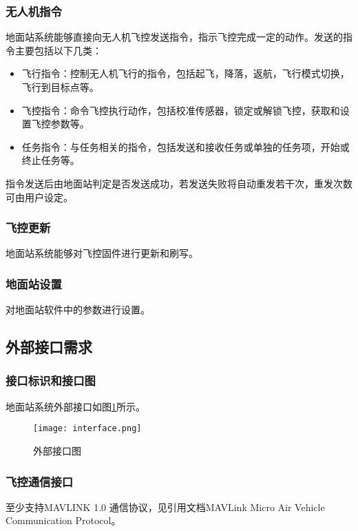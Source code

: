 \subsubsection{无人机指令}
地面站系统能够直接向无人机飞控发送指令，指示飞控完成一定的动作。发送的指令主要包括以下几类：
\begin{itemize}
\setlength{\itemsep}{-2pt}
\item 飞行指令：控制无人机飞行的指令，包括起飞，降落，返航，飞行模式切换，飞行到目标点等。
\item 飞控指令：命令飞控执行动作，包括校准传感器，锁定或解锁飞控，获取和设置飞控参数等。
\item 任务指令：与任务相关的指令，包括发送和接收任务或单独的任务项，开始或终止任务等。
\end{itemize}

指令发送后由地面站判定是否发送成功，若发送失败将自动重发若干次，重发次数可由用户设定。

\subsubsection{飞控更新}
地面站系统能够对飞控固件进行更新和刷写。

\subsubsection{地面站设置}
对地面站软件中的参数进行设置。

\subsection{外部接口需求}

\subsubsection{接口标识和接口图}
地面站系统外部接口如图\ref{f3int}所示。
\begin{figure}[ht]
	\begin{center}
		\texttt{[image: interface.png]}
		\caption{外部接口图}
		\label{f3int}
	\end{center}
\end{figure}

\subsubsection{飞控通信接口}
至少支持MAVLINK 1.0 通信协议，见引用文档MAVLink Micro Air Vehicle Communication Protocol。



